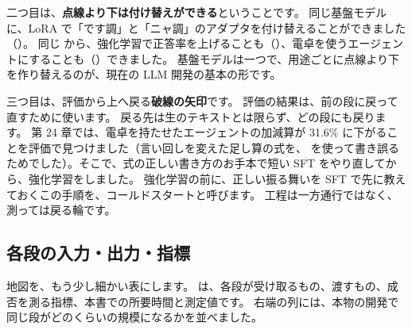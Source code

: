二つ目は、\textbf{点線より下は付け替えができる}ということです。
同じ基盤モデル  に、LoRA で「です調」と「ニャ調」のアダプタを付け替えることができました（）。
同じ  から、強化学習で正答率を上げることも（）、電卓を使うエージェントにすることも（）できました。
基盤モデルは一つで、用途ごとに点線より下を作り替えるのが、現在の LLM 開発の基本の形です。

三つ目は、評価から上へ戻る\textbf{破線の矢印}です。
評価の結果は、前の段に戻って直すために使います。
戻る先は生のテキストとは限らず、どの段にも戻ります。
第 24 章では、電卓を持たせたエージェントの加減算が 31.6\% に下がることを評価で見つけました（言い回しを変えた足し算の式を、\code{*} を使って書き誤るためでした）。そこで、式の正しい書き方のお手本で短い SFT をやり直してから、強化学習をしました。
強化学習の前に、正しい振る舞いを SFT で先に教えておくこの手順を、コールドスタートと呼びます。
工程は一方通行ではなく、測っては戻る輪です。

\subsection*{各段の入力・出力・指標}

地図を、もう少し細かい表にします。
は、各段が受け取るもの、渡すもの、成否を測る指標、本書での所要時間と測定値です。
右端の列には、本物の開発で同じ段がどのくらいの規模になるかを並べました。


